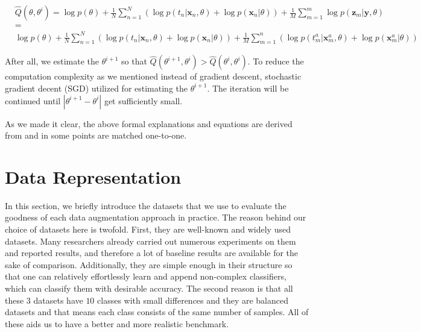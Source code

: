 \begin{equation}
  \begin{aligned}
     & \hat{Q}\left(\theta, \theta^{i}\right)=\log p(\theta)+\frac{1}{N} \sum_{n=1}^{N}\left(\log p\left(t_{n} | \mathbf{x}_{n}, \theta\right)+\log p\left(\mathbf{x}_{n} | \theta\right)\right)+\frac{1}{M} \sum_{m=1}^{m} \log p\left(\mathbf{z}_{m} | \mathbf{y}, \theta\right) \\
     & =                                                                                                                                                                                                                                                                           \\
     & \log p(\theta)+\frac{1}{N} \sum_{n=1}^{N}\left(\log p\left(t_{n} | \mathbf{x}_{n}, \theta\right)+\log p\left(\mathbf{x}_{n} | \theta\right)\right)+\frac{1}{M}
    \sum_{m=1}^{n}\left(\log p\left(t_{m}^{a} | \mathbf{x}_{m}^{a}, \theta\right)+\log p\left(\mathbf{x}_{m}^{a} | \theta\right)\right)
  \end{aligned}
\end{equation}

After all, we estimate the $\theta^{i +1}$ so that $\hat{Q}(\theta^{i +1}, \theta^{i}) >
  \hat{Q}(\theta^{i}, \theta^{i})$. To reduce the computation complexity as we mentioned instead of
gradient descent, stochastic gradient decent (SGD) utilized for estimating the $\theta^{i +1}$. The
iteration will be continued until $|\theta^{i +1} - \theta^{i}|$ get sufficiently small.

As we made it clear, the above formal explanations and equations are derived from \cite{refrence_bayesian_approach} and in some points are matched one-to-one.

\chapter{Data Representation}
\label{tit:data-representation}
In this section, we briefly introduce the datasets that we use to evaluate the goodness of each data
augmentation approach in practice. The reason behind our choice of datasets here is twofold. First,
they are well-known and widely used datasets. Many researchers already carried out numerous
experiments on them and reported results, and therefore a lot of baseline results are available for
the sake of comparison. Additionally, they are simple enough in their structure so that one can
relatively effortlessly learn and append non-complex classifiers, which can classify them with
desirable accuracy. The second reason is that all these $3$ datasets have $10$ classes with small
differences and they are balanced datasets and that means each class consists of the same number of
samples. All of these aids us to have a better and more realistic benchmark.

